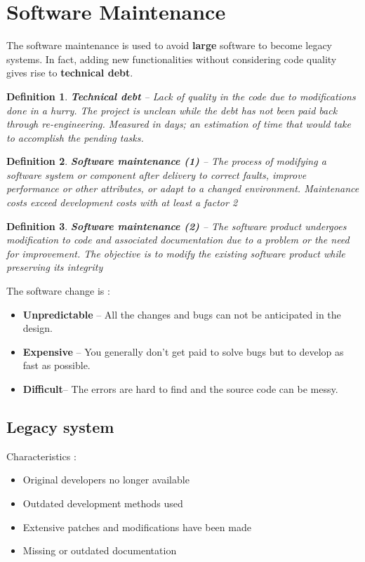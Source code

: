 \documentclass[a4paper,11pt]{report}
\newtheorem{definition}{Definition}
\begin{document}
\section{Software Maintenance}\noindent
	The software maintenance is used
		to avoid \textbf{large} software to become 
		legacy systems. In fact, adding
		new functionalities without 
		considering code quality gives rise
		to \textbf{technical debt}.
	\begin{definition}
		\textbf{Technical debt} -- 
			Lack of quality in the code due to 
			modifications done in a hurry.
			The project is unclean while the debt
			has not been paid back through 
			re-engineering. Measured in days; 
			an estimation of time that would take
			to accomplish the pending tasks.
	\end{definition}
	\begin{definition}
		\textbf{Software maintenance (1)} -- 
			The process of modifying a software 
			system or component after delivery 
			to correct faults, improve 
			performance or other attributes, 
			or adapt to a changed environment. 
			Maintenance costs exceed development 
			costs with at least a factor 2
	\end{definition}
	\begin{definition}
		\textbf{Software maintenance (2)} -- 
			The software product undergoes 
			modification to code and associated 
			documentation due to a problem or
			the need for improvement. 
			The objective is to modify
			the existing software product 
			while preserving its integrity
	\end{definition}\noindent
	The software change is :
	\begin{itemize}
		\setlength{\itemsep}{0pt}		
		\setlength{\parskip}{0pt}		
		\setlength{\parsep}{0pt}	
		\item \textbf{Unpredictable} --
			All the changes and bugs can not be
			anticipated in the design.
		\item \textbf{Expensive} --
			You generally don't get paid to solve bugs but
			to develop as fast as possible.
		\item \textbf{Difficult}-- The errors are hard
			to find and the source code can be messy.
	\end{itemize}
	\subsection{Legacy system}
		Characteristics : 
		\begin{itemize}
			\setlength{\itemsep}{0pt}		
			\setlength{\parskip}{0pt}		
			\setlength{\parsep}{0pt}	
			\item Original developers no longer
				available
			\item Outdated development methods
				used
			\item Extensive patches and modifications 
				have been made
			\item Missing or outdated documentation
		\end{itemize}
\end{document}
